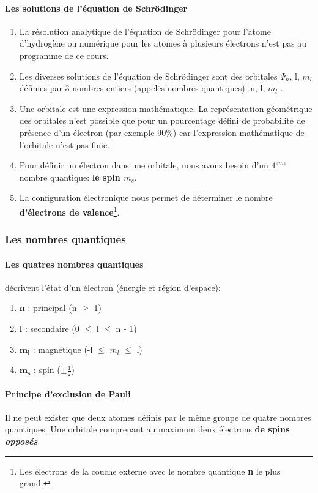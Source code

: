\documentclass[10pt,a4paper]{book}
\begin{document}
\paragraph{Les solutions de l'équation de Schrödinger}
\begin{enumerate}
\item La résolution analytique de l’équation de Schrödinger pour l’atome d’hydrogène ou numérique pour les atomes à plusieurs électrons n’est pas au programme de ce cours.
\item Les diverses solutions de l’équation de Schrödinger sont des orbitales $\Psi_n$, l, $m_l$ définies par 3 nombres entiers (appelés nombres quantiques): n, l, $m_l$ .
\item Une orbitale est une expression mathématique. La représentation géométrique des orbitales n’est possible que pour un pourcentage défini de probabilité de présence d’un électron (par exemple 90\%) car l’expression mathématique de l’orbitale n’est pas finie.
\item  Pour définir un électron dans une orbitale, nous avons besoin d’un $4^{\grave{e}me}$ nombre quantique: \textbf{le spin $m_s$}. \label{spin}
\item  La configuration électronique nous permet de déterminer le nombre \textbf{d'électrons de valence}\footnote{Les électrons de la couche externe avec le nombre quantique \textbf{n} le plus grand.}.
\end{enumerate}

\subsubsection{Les nombres quantiques}

\paragraph{Les quatres nombres quantiques} décrivent l'état d'un électron (énergie et région d'espace):
\begin{enumerate}
\item \textbf{n} : principal (n $\geq$ 1)
\item \textbf{l} : secondaire (0 $\leq$ l $\leq$ n - 1) 
\item $\mathbf{m_l}$ : magnétique (-l $\leq$ $m_l$ $\leq$ l)
\item $\mathbf{m_s}$ : spin ($\pm \frac{1}{2}$)
\end{enumerate}
\paragraph{Principe d'exclusion de Pauli} Il ne peut exister que deux atomes définis par le même groupe de quatre nombres quantiques. Une orbitale comprenant au maximum deux électrons \textbf{de spins \textit{opposés}} \label{eq:1}
\end{document}
